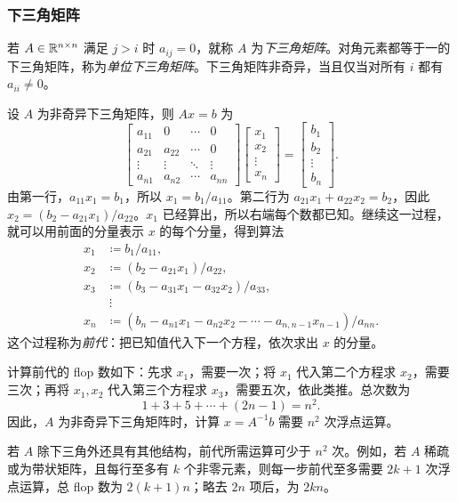 \subsubsection*{下三角矩阵}
若 $A\in\mathbb R^{n\times n}$ 满足 $j>i$ 时 $a_{ij}=0$，就称 $A$ 为\emph{下三角矩阵}。对角元素都等于一的下三角矩阵，称为\emph{单位下三角矩阵}。下三角矩阵非奇异，当且仅当对所有 $i$ 都有 $a_{ii}\neq0$。

设 $A$ 为非奇异下三角矩阵，则 $Ax=b$ 为
\[
 \begin{bmatrix}
 a_{11}&0&\cdots&0\\
 a_{21}&a_{22}&\cdots&0\\
 \vdots&\vdots&\ddots&\vdots\\
 a_{n1}&a_{n2}&\cdots&a_{nn}
 \end{bmatrix}
 \begin{bmatrix}x_1\\x_2\\\vdots\\x_n\end{bmatrix}
 =\begin{bmatrix}b_1\\b_2\\\vdots\\b_n\end{bmatrix}.
\]
由第一行，$a_{11}x_1=b_1$，所以 $x_1=b_1/a_{11}$。第二行为 $a_{21}x_1+a_{22}x_2=b_2$，因此 $x_2=(b_2-a_{21}x_1)/a_{22}$。$x_1$ 已经算出，所以右端每个数都已知。继续这一过程，就可以用前面的分量表示 $x$ 的每个分量，得到算法
\begin{align*}
 x_1&\coloneqq b_1/a_{11},\\
 x_2&\coloneqq(b_2-a_{21}x_1)/a_{22},\\
 x_3&\coloneqq(b_3-a_{31}x_1-a_{32}x_2)/a_{33},\\
 &\ \vdots\\
 x_n&\coloneqq(b_n-a_{n1}x_1-a_{n2}x_2-\cdots-a_{n,n-1}x_{n-1})/a_{nn}.
\end{align*}
这个过程称为\emph{前代}：把已知值代入下一个方程，依次求出 $x$ 的分量。

计算前代的 flop 数如下：先求 $x_1$，需要一次；将 $x_1$ 代入第二个方程求 $x_2$，需要三次；再将 $x_1,x_2$ 代入第三个方程求 $x_3$，需要五次，依此类推。总次数为
\[
 1+3+5+\cdots+(2n-1)=n^2.
\]
因此，$A$ 为非奇异下三角矩阵时，计算 $x=A^{-1}b$ 需要 $n^2$ 次浮点运算。

若 $A$ 除下三角外还具有其他结构，前代所需运算可少于 $n^2$ 次。例如，若 $A$ 稀疏或为带状矩阵，且每行至多有 $k$ 个非零元素，则每一步前代至多需要 $2k+1$ 次浮点运算，总 flop 数为 $2(k+1)n$；略去 $2n$ 项后，为 $2kn$。

